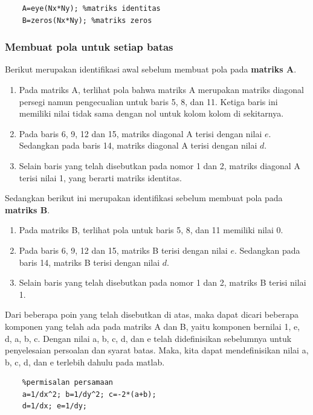 \documentclass{article}
\begin{document}
\begin{lstlisting}
    A=eye(Nx*Ny); %matriks identitas
    B=zeros(Nx*Ny); %matriks zeros
\end{lstlisting}

\subsubsection{Membuat pola untuk setiap batas}
Berikut merupakan identifikasi awal sebelum membuat pola pada \textbf{matriks A}.
\begin{enumerate}
    \item Pada matriks A, terlihat pola bahwa matriks A merupakan matriks diagonal persegi namun pengecualian untuk baris 5, 8, dan 11. Ketiga baris ini memiliki nilai tidak sama dengan nol untuk kolom kolom di sekitarnya.
    \item Pada baris 6, 9, 12 dan 15, matriks diagonal A terisi dengan nilai \(e\). Sedangkan pada baris 14, matriks diagonal A terisi dengan nilai \(d\).
    \item Selain baris yang telah disebutkan pada nomor 1 dan 2, matriks diagonal A terisi nilai 1, yang berarti matriks identitas.
\end{enumerate}
Sedangkan berikut ini merupakan identifikasi sebelum membuat pola pada \textbf{matriks B}.
\begin{enumerate}
    \item Pada matriks B, terlihat pola untuk baris 5, 8, dan 11 memiliki nilai 0.
    \item Pada baris 6, 9, 12 dan 15, matriks B terisi dengan nilai \(e\). Sedangkan pada baris 14, matriks B terisi dengan nilai \(d\).
    \item Selain baris yang telah disebutkan pada nomor 1 dan 2, matriks B terisi nilai 1.
\end{enumerate}

\bigskip
Dari beberapa poin yang telah disebutkan di atas, maka dapat dicari beberapa komponen yang telah ada pada matriks A dan B, yaitu komponen bernilai 1, e, d, a, b, c. Dengan nilai a, b, c, d, dan e telah didefinisikan sebelumnya untuk penyelesaian persoalan dan syarat batas. Maka, kita dapat mendefinisikan nilai a, b, c, d, dan e terlebih dahulu pada matlab.
\begin{lstlisting}
    %permisalan persamaan
    a=1/dx^2; b=1/dy^2; c=-2*(a+b); 
    d=1/dx; e=1/dy; 
\end{lstlisting}
\end{document}
